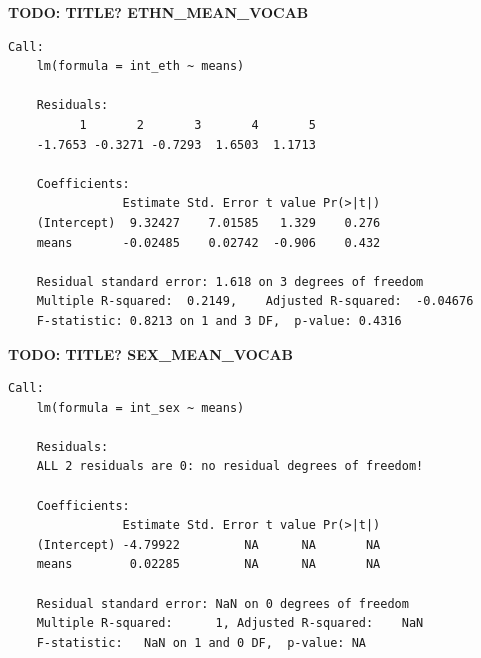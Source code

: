 \documentclass[11pt]{article}  %
\begin{document}
\textbf{TODO: TITLE? ETHN\_MEAN\_VOCAB}
\label{sec:EthMVlm}
\begin{lstlisting}[basicstyle=\small]
    Call:
    lm(formula = int_eth ~ means)
    
    Residuals:
          1       2       3       4       5 
    -1.7653 -0.3271 -0.7293  1.6503  1.1713 
    
    Coefficients:
                Estimate Std. Error t value Pr(>|t|)
    (Intercept)  9.32427    7.01585   1.329    0.276
    means       -0.02485    0.02742  -0.906    0.432
    
    Residual standard error: 1.618 on 3 degrees of freedom
    Multiple R-squared:  0.2149,	Adjusted R-squared:  -0.04676 
    F-statistic: 0.8213 on 1 and 3 DF,  p-value: 0.4316
\end{lstlisting}
\textbf{TODO: TITLE? SEX\_MEAN\_VOCAB}
\label{sec:EthMVlm}
\begin{lstlisting}[basicstyle=\small]
    Call:
    lm(formula = int_sex ~ means)
    
    Residuals:
    ALL 2 residuals are 0: no residual degrees of freedom!
    
    Coefficients:
                Estimate Std. Error t value Pr(>|t|)
    (Intercept) -4.79922         NA      NA       NA
    means        0.02285         NA      NA       NA
    
    Residual standard error: NaN on 0 degrees of freedom
    Multiple R-squared:      1,	Adjusted R-squared:    NaN 
    F-statistic:   NaN on 1 and 0 DF,  p-value: NA
\end{lstlisting}
\end{document}
